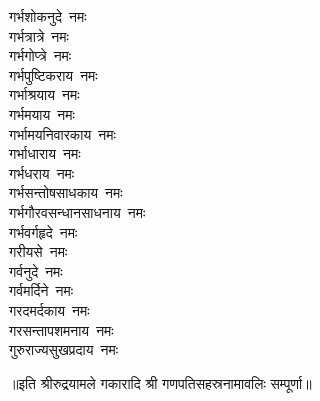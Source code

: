 \begin{multicols}{2}
\begin{flushleft}
गर्भशोकनुदे~नमः\\
गर्भत्रात्रे~नमः\\
गर्भगोप्त्रे~नमः\\
गर्भपुष्टिकराय~नमः\\
गर्भाश्रयाय~नमः\\
गर्भमयाय~नमः\\
गर्भामयनिवारकाय~नमः\\
गर्भाधाराय~नमः\hfill{}\\
गर्भधराय~नमः\\
गर्भसन्तोषसाधकाय~नमः\\
गर्भगौरवसन्धानसाधनाय~नमः\\
गर्भवर्गहृदे~नमः\\
गरीयसे~नमः\\
गर्वनुदे~नमः\\
गर्वमर्दिने~नमः\\
गरदमर्दकाय~नमः\\
गरसन्तापशमनाय~नमः\\
गुरुराज्यसुखप्रदाय~नमः\hfill{}\\
\end{flushleft}
\end{multicols}
\centerline{॥इति श्रीरुद्रयामले गकारादि श्री गणपतिसहस्रनामावलिः सम्पूर्णा॥}
